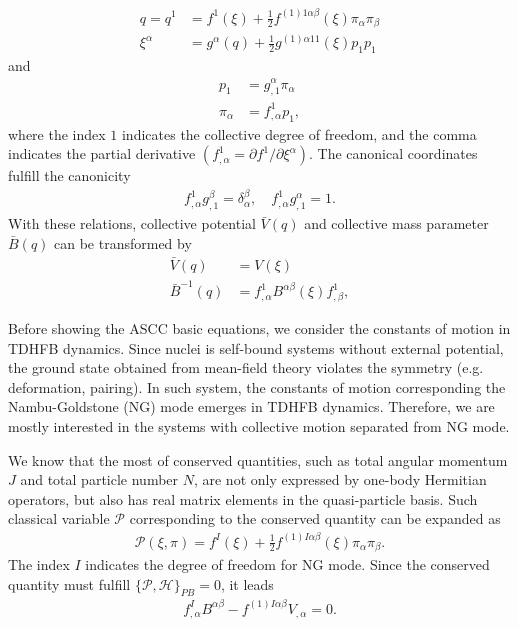 \documentclass[%
superscriptaddress,
showpacs,
nofootinbib,
amsmath,amssymb,
aps,
prc,
twocolumn,
floatfix ]%
{revtex4-1}
\begin{document}
\begin{align}
  q = q^1 &= f^1(\xi) + \frac{1}{2}f^{(1)1\alpha\beta}(\xi)\pi_{\alpha}\pi_{\beta}  \label{point}\\
 \xi^{\alpha} &= g^{\alpha}(q) + \frac{1}{2}g^{(1)\alpha 1 1}(\xi)p_{1}p_{1}
\end{align}
and
\begin{align}
  p_1 &= g_{,1}^{\alpha}\pi_{\alpha} \\
 \pi_{\alpha} &= f^1_{,\alpha}p_1 ,
  \label{momenta}
\end{align}
where the index $1$ indicates the collective degree of freedom, and the comma indicates the partial derivative $(f^1_{,\alpha}=\partial f^1/\partial \xi^{\alpha})$. The canonical coordinates fulfill the canonicity
\begin{align}
  f^1_{,\alpha}g_{,1}^{\beta} = \delta^{\beta}_{\alpha}, \quad f^1_{,\alpha}g_{,1}^{\alpha} = 1.
  \label{canonicity}
\end{align}
With these relations, collective potential $\bar{V}(q)$ and collective mass parameter $\bar{B}(q)$ can be transformed by
\begin{align}
  \bar{V}(q) &= V(\xi) \\
  \bar{B}^{-1}(q) &= f^1_{,\alpha}B^{\alpha\beta}(\xi)f^1_{,\beta} ,
  \label{coll_mass}
\end{align}

Before showing the ASCC basic equations, we consider the constants of motion in TDHFB dynamics. Since nuclei is self-bound systems without external potential, the ground state obtained from mean-field theory violates the symmetry (e.g. deformation, pairing). In such system, the constants of motion corresponding the Nambu-Goldstone (NG) mode emerges in TDHFB dynamics. Therefore, we are mostly interested in the systems with collective motion separated from NG mode.\par
We know that the most of conserved quantities, such as total angular momentum $J$ and total particle number $N$, are not only expressed by one-body Hermitian operators, but also has real matrix elements in the quasi-particle basis. Such classical variable $\mathcal{P}$ corresponding to the conserved quantity can be expanded as
\begin{align}
  \mathcal{P}(\xi,\pi) = f^I(\xi) + \frac{1}{2}f^{(1)I\alpha\beta}(\xi)\pi_{\alpha}\pi_{\beta} . \label{P}
\end{align}
The index $I$ indicates the degree of freedom for NG mode. Since the conserved quantity must fulfill $\{\mathcal{P},\mathcal{H}\}_{PB}=0$, it leads
\begin{align}
  f^{I}_{,\alpha}B^{\alpha\beta} - f^{(1)I\alpha\beta}V_{,\alpha} = 0.
  \label{P_PB}
\end{align}
\end{document}
